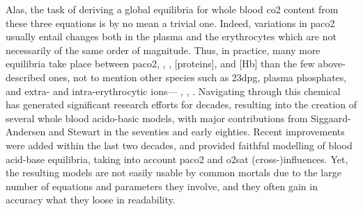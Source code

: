 Alas, the task of deriving a global equilibria for whole blood \gls{co2} content from these three equations is by no mean a trivial one. Indeed, variations in \gls{paco2} usually entail \pH{} changes both in the plasma and the erythrocytes which are not necessarily of the same order of magnitude. Thus, in practice, many more equilibria take place between \gls{paco2}, \pH, \ce{[HCO3^-]}, [proteins], and [Hb] than the few above-described ones, not to mention other species such as \gls{23dpg}, plasma phosphates, and extra- and intra-erythrocytic ions---\ie{} , , \etc{}. Navigating through this chemical  has generated significant research efforts for decades, resulting into the creation of several whole blood acido-basic models, with major contributions from Siggaard-Andersen\cite{siggaard1974acid} and Stewart\cite{stewart1981understand} in the seventies and early eighties. Recent improvements were added within the last two decades, and provided faithful modelling of blood acid-base equilibria, taking into account \gls{paco2} and \gls{o2sat} (cross-)influences\cite{rees2010, oneill2017, jezek2018}. Yet, the resulting models are not easily usable by common mortals due to the large number of equations and parameters they involve, and they often gain in accuracy what they loose in readability.


